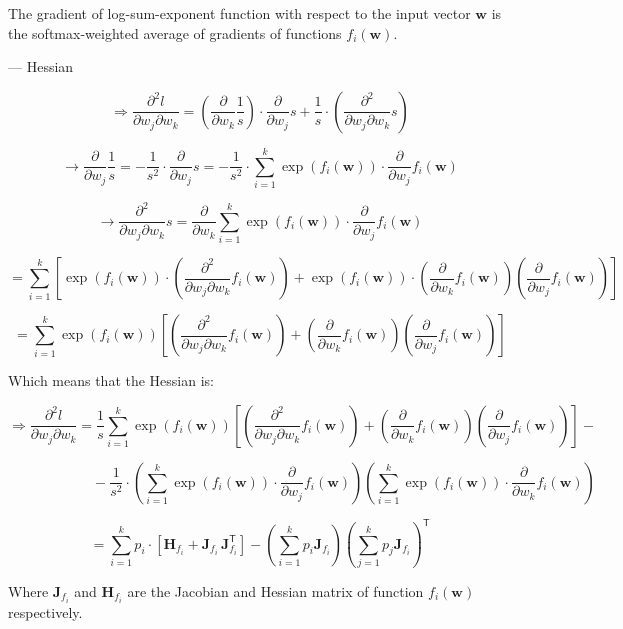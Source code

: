 The gradient of log-sum-exponent function with respect to the input vector  $\mathbf{w}$ is the softmax-weighted average of gradients of functions $f_i(\mathbf{w})$.

---
Hessian

$$\Longrightarrow\frac{\partial^2 l}{\partial w_j\partial w_k}=\left(\frac{\partial}{\partial w_k}\frac{1}{s}\right)\cdot\frac{\partial}{\partial w_j}s+\frac{1}{s}\cdot\left(\frac{\partial^2}{\partial w_j\partial w_k}s\right)$$

$$\rightarrow\frac{\partial}{\partial w_j}\frac{1}{s}=-\frac{1}{s^2}\cdot\frac{\partial}{\partial w_j}s=-\frac{1}{s^2}\cdot\sum_{i=1}^{k}\exp(f_i(\mathbf{w}))\cdot\frac{\partial}{\partial w_j}f_i(\mathbf{w})$$

$$\rightarrow\frac{\partial^2}{\partial w_j\partial w_k}s=\frac{\partial}{\partial w_k}\sum_{i=1}^{k}\exp(f_i(\mathbf{w}))\cdot\frac{\partial}{\partial w_j}f_i(\mathbf{w})$$

$$=\sum_{i=1}^{k}\left[\exp(f_i(\mathbf{w}))\cdot\left(\frac{\partial^2}{\partial w_j\partial w_k}f_i(\mathbf{w})\right)+\exp(f_i(\mathbf{w}))\cdot\left(\frac{\partial}{\partial w_k}f_i(\mathbf{w})\right)\left(\frac{\partial}{\partial w_j}f_i(\mathbf{w})\right)\right]$$

$$=\sum_{i=1}^{k}\exp(f_i(\mathbf{w}))\left[\left(\frac{\partial^2}{\partial w_j\partial w_k}f_i(\mathbf{w})\right)+\left(\frac{\partial}{\partial w_k}f_i(\mathbf{w})\right)\left(\frac{\partial}{\partial w_j}f_i(\mathbf{w})\right)\right]$$

Which means that the Hessian is:

$$\Longrightarrow\frac{\partial^2 l}{\partial w_j\partial w_k}=\frac{1}{s}\sum_{i=1}^{k}\exp(f_i(\mathbf{w}))\left[\left(\frac{\partial^2}{\partial w_j\partial w_k}f_i(\mathbf{w})\right)+\left(\frac{\partial}{\partial w_k}f_i(\mathbf{w})\right)\left(\frac{\partial}{\partial w_j}f_i(\mathbf{w})\right)\right]-$$

$$\qquad\qquad\qquad-\frac{1}{s^2}\cdot\left(\sum_{i=1}^{k}\exp(f_i(\mathbf{w}))\cdot\frac{\partial}{\partial w_j}f_i(\mathbf{w})\right)\left(\sum_{i=1}^{k}\exp(f_i(\mathbf{w}))\cdot\frac{\partial}{\partial w_k}f_i(\mathbf{w})\right)$$

$$=\sum_{i=1}^{k}p_i\cdot\left[\mathbf{H}_{f_i}+\mathbf{J}_{f_i}^{}\,\mathbf{J}_{f_i}^{\mathsf{T}}\right]-\left(\sum_{i=1}^{k}p_i\mathbf{J}_{f_i}\right)\left(\sum_{j=1}^{k}p_j\mathbf{J}_{f_i}\right)^{\mathsf{T}}$$

Where $\mathbf{J}_{f_i}$ and $\mathbf{H}_{f_i}$ are the Jacobian and Hessian matrix of function $f_i(\mathbf{w})$ respectively.

